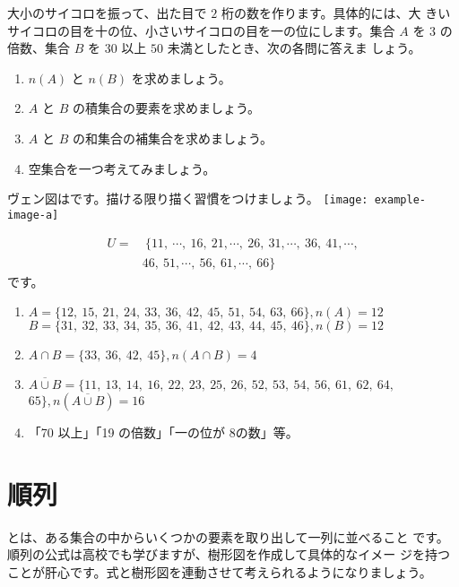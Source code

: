 \begin{simQ}
大小のサイコロを振って、出た目で $2$ 桁の数を作ります。具体的には、大 きいサイコロの目を十の位、小さいサイコロの目を一の位にします。集合 $A$ を $3$ の倍数、集合 $B$ を $30$ 以上 $50$ 未満としたとき、次の各問に答えま しょう。
\begin{enumerate}[label=(\arabic*), itemsep=0pt, parsep=0pt]
\item $n(A)$ と $n(B)$ を求めましょう。 
\item $A$ と $B$ の積集合の要素を求めましょう。
\item $A$ と $B$ の和集合の補集合を求めましょう。 
\item 空集合を一つ考えてみましょう。
\end{enumerate}
\end{simQ}
\begin{simA}
    ヴェン図はです。描ける限り描く習慣をつけましょう。
    {\centering
    \texttt{[image: example-image-a]}
    }

    \begin{align*}
        U = &\ \{11,~\cdots,~16,~ 21,\cdots,~26,~31,\cdots,~36,~41,\cdots,\\
            &46,~51,\cdots ,~56,~61,\cdots,~66\}
    \end{align*}
    です。
    
    \begin{enumerate}[label=(\arabic*), itemsep=0pt, parsep=0pt]
        \item $A = \{12,\ 15,\ 21,\ 24,\ 33,\ 36,\ 42,\ 45,\ 51,\ 54,\ 63,\ 66\}, n(A) = 12$ \\
        $B = \{31,\ 32,\ 33,\ 34,\ 35,\ 36,\ 41,\ 42,\ 43,\ 44,\ 45,\ 46\}, n(B) = 12$
        \item $A \cap B = \{33,\ 36,\ 42,\ 45\}, n(A \cap B) = 4$
        \item $\overline{A \cup B} = \{11,\ 13,\ 14,\ 16,\ 22,\ 23,\ 25,\ 26,\ 52,\ 53,\ 54,\ 56,\ 61,\ 62,\ 64,$ $65\}, n(\overline{A \cup B})=16$
        \item 「70 以上」「19 の倍数」「一の位が 8の数」等。
    \end{enumerate}
\end{simA}

\section{順\quad 列}
とは、ある集合の中からいくつかの要素を取り出して一列に並べること です。順列の公式は高校でも学びますが、樹形図を作成して具体的なイメー ジを持つことが肝心です。式と樹形図を連動させて考えられるようになりましょう。

